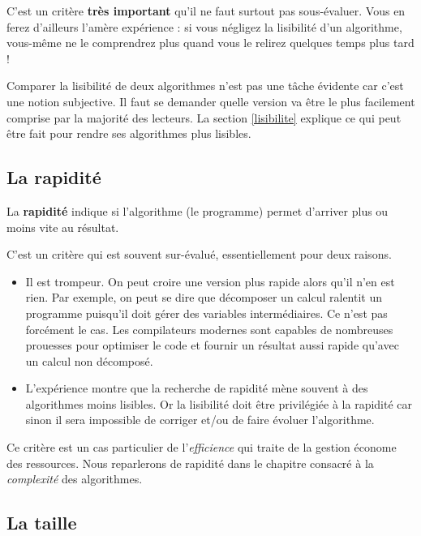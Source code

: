 			C'est un critère \textbf{très important}
			qu'il ne faut surtout pas sous-évaluer.
			Vous en ferez d'ailleurs l'amère expérience :
			si vous négligez la lisibilité d'un algorithme,
			vous-même ne le comprendrez plus quand vous le relirez
			quelques temps plus tard !
			
			Comparer la lisibilité de deux algorithmes
			n'est pas une tâche évidente car c'est une notion subjective.
			Il faut se demander quelle version va être le plus facilement
			comprise par la majorité des lecteurs.		
			La section \vref{lisibilite}
			explique ce qui peut être fait pour rendre ses algorithmes
			plus lisibles.
				
		\subsection{La rapidité}
	    
			La \textbf{rapidité}
			indique si l'algorithme (le programme)
			permet d'arriver plus ou moins vite au résultat.
			
			C'est un critère qui est souvent sur-évalué, 
			essentiellement pour deux raisons.
			\begin{itemize}
				\item 
					Il est trompeur. 
					On peut croire une version plus rapide alors qu'il n'en est rien.
					Par exemple, on peut se dire que décomposer un calcul
					ralentit un programme puisqu'il doit gérer des variables
					intermédiaires.
					Ce n'est pas forcément le cas.
					Les compilateurs modernes sont capables
					de nombreuses prouesses pour optimiser le code
					et fournir un résultat aussi rapide
					qu'avec un calcul non décomposé.
				\item
					L'expérience montre que la recherche de rapidité
					mène souvent à des algorithmes moins lisibles.
					Or la lisibilité doit être privilégiée à la rapidité
					car sinon il sera impossible de corriger et/ou
					de faire évoluer l'algorithme.
			\end{itemize}
		
			Ce critère est un cas particulier de l'\emph{efficience}
			qui traite de la gestion économe des ressources.
			Nous reparlerons de rapidité
			dans le chapitre consacré à la \emph{complexité}
			des algorithmes.
		
		\subsection{La taille}
		

